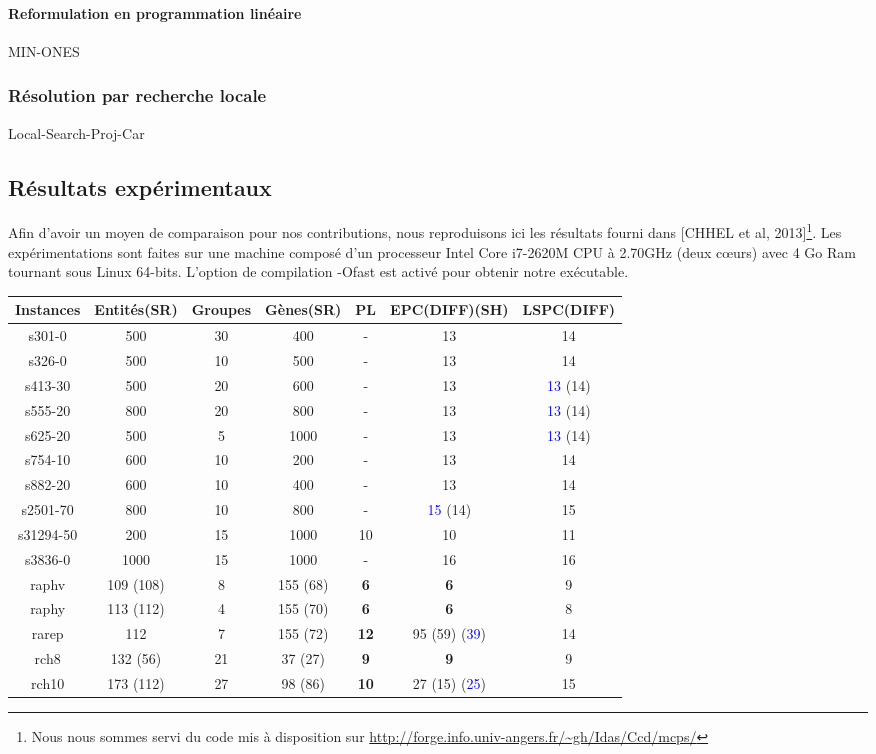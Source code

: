 \documentclass[a4paper,10pt]{article}
\begin{document}
\paragraph{Reformulation en programmation linéaire}
MIN-ONES
\subsubsection{Résolution par recherche locale}
Local-Search-Proj-Car

\subsection{Résultats expérimentaux}
Afin d'avoir un moyen de comparaison pour nos contributions, nous reproduisons ici les résultats fourni dans [CHHEL et al, 2013]\footnote{Nous nous sommes servi du code mis à disposition sur \url{http://forge.info.univ-angers.fr/~gh/Idas/Ccd/mcps/}}. Les expérimentations sont faites sur une machine composé d'un processeur Intel Core i7-2620M CPU à 2.70GHz (deux cœurs) avec 4 Go Ram tournant sous Linux 64-bits. L'option de compilation -Ofast est activé pour obtenir notre exécutable.
\begin{center}
\begin{tabular}{|c|c|c|c|c|c|c|}
\hline 
Instances & Entités(SR) & Groupes & Gènes(SR) & PL & EPC(DIFF)(SH) & LSPC(DIFF) \\ 
\hline 
s301-0 & 500 & 30 & 400 & - & 13 & 14 \\ 
\hline 
s326-0 & 500 & 10 & 500 & - & 13 & 14 \\ 
\hline 
s413-30 & 500 & 20 & 600 & - & 13 & \textcolor{blue}{13} (14) \\ 
\hline 
s555-20 & 800 & 20 & 800 & - & 13 & \textcolor{blue}{13} (14) \\ 
\hline 
s625-20 & 500 & 5 & 1000 & - & 13 & \textcolor{blue}{13} (14) \\ 
\hline 
s754-10 & 600 & 10 & 200 & - & 13 & 14 \\ 
\hline 
s882-20 & 600 & 10 & 400 & - & 13 & 14 \\ 
\hline 
s2501-70 & 800 & 10 & 800 & - & \textcolor{blue}{15} (14) & 15 \\ 
\hline 
s31294-50 & 200 & 15 & 1000 & 10 & 10 & 11 \\ 
\hline 
s3836-0 & 1000 & 15 & 1000 & - & 16 & 16 \\ 
\hline 
raphv & 109 (108) & 8 & 155 (68) & \textbf{6} & \textbf{6} & 9 \\ 
\hline 
raphy & 113 (112) & 4 & 155 (70) & \textbf{6} & \textbf{6} & 8 \\ 
\hline 
rarep & 112 & 7 & 155 (72) & \textbf{12} & 95 (59) (\textcolor{blue}{39}) & 14 \\ 
\hline 
rch8 & 132 (56) & 21 & 37 (27) & \textbf{9} & \textbf{9} & 9 \\ 
\hline 
rch10 & 173 (112) & 27 & 98 (86) & \textbf{10} & 27 (15) (\textcolor{blue}{25}) & 15 \\ 
\hline 
\end{tabular} 
\end{center}
\end{document}
